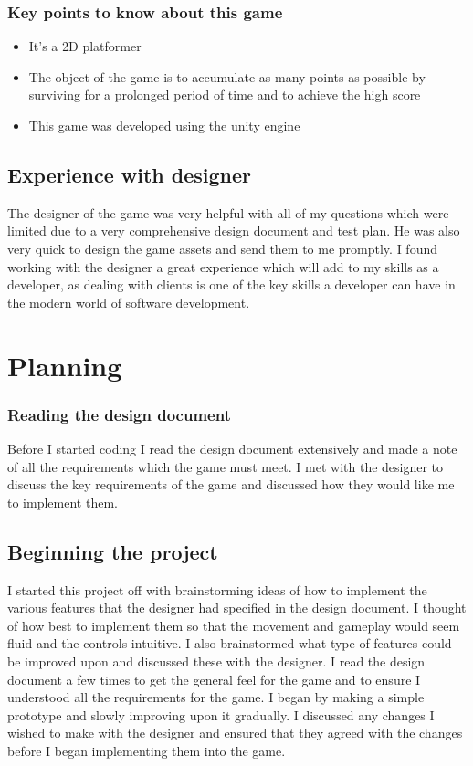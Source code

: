 \documentclass{report}
\begin{document}
 \subsection{Key points to know about this game}
 \begin{itemize}
     \item It's a 2D platformer
     \item The object of the game is to accumulate as many points as possible by surviving for a prolonged period of time and to achieve the high score
     \item This game was developed using the unity engine
 \end{itemize}
 \section{Experience with designer}
 The designer of the game was very helpful with all of my questions which were limited due to a very comprehensive design document and test plan.  He was also very quick to design the game assets and send them to me promptly.  I found working with the designer a great experience which will add to my skills as a developer, as dealing with clients is one of the key skills a developer can have in the modern world of software development.
\chapter{Planning}
\subsection{Reading the design document}
Before I started coding I read the design document extensively and made a note of all the requirements which the game must meet.  I met with the designer to discuss the key requirements of the game and discussed how they would like me to implement them.
\section{Beginning the project}
I started this project off with brainstorming ideas of how to implement the various features that the designer had specified in the design document. I thought of how best to implement them so that the movement and gameplay would seem fluid and the controls intuitive. I also brainstormed what type of features could be improved upon and discussed these with the designer. I read the design document a few times to get the general feel for the game and to ensure I understood all the requirements for the game.  I began by making a simple prototype and slowly improving upon it gradually.  I discussed any changes I wished to make with the designer and ensured that they agreed with the changes before I began implementing them into the game.
\end{document}
